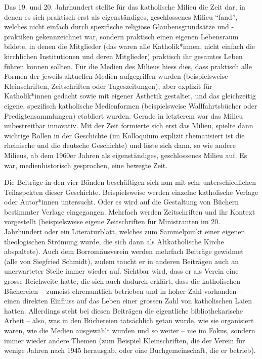 \documentclass[a4paper,
fontsize=11pt,
oneside,
numbers=noperiodatend,
parskip=half-,
bibliography=totoc,
final
]{scrartcl}
\begin{document}
Das 19. und 20. Jahrhundert stellte für das katholische Milieu die Zeit
dar, in denen es sich praktisch erst als eigenständiges, geschlossenes
Milieu \enquote{fand}, welches nicht einfach durch spezifische religiöse
Glaubensgrundsätze und -praktiken gekennzeichnet war, sondern praktisch
einen eigenen Lebensraum bildete, in denen die Mitglieder (das waren
alle Katholik*innen, nicht einfach die kirchlichen Institutionen und
deren Mitglieder) praktisch ihr gesamtes Leben führen können sollten.
Für die Medien des Milieus hiess dies, dass praktisch alle Formen der
jeweils aktuellen Medien aufgegriffen wurden (beispielsweise
Kleinschriften, Zeitschriften oder Tageszeitungen), aber explizit für
Katholik*innen gedacht sowie mit eigener Ästhetik gestaltet, und das
gleichzeitig eigene, spezifisch katholische Medienformen (beispielsweise
Wallfahrtsbücher oder Predigtensammlungen) etabliert wurden. Gerade in
letzterem war das Milieu unbestreitbar innovativ. Mit der Zeit formierte
sich erst das Milieu, spielte dann wichtige Rollen in der Geschichte (im
Kolloquium explizit thematisiert ist die rheinische und die deutsche
Geschichte) und löste sich dann, so wie andere Milieus, ab dem 1960er
Jahren als eigenständiges, geschlossenes Milieu auf. Es war,
medienhistorisch gesprochen, eine bewegte Zeit.

Die Beiträge in den vier Bänden beschäftigen sich nun mit sehr
unterschiedlichen Teilaspekten dieser Geschichte. Beispielsweise werden
einzelne katholische Verlage oder Autor*innen untersucht. Oder es wird
auf die Gestaltung von Büchern bestimmter Verlage eingegangen. Mehrfach
werden Zeitschriften und ihr Kontext vorgestellt (beispielsweise eigene
Zeitschriften für Ministranten im 20. Jahrhundert oder ein
Literaturblatt, welches zum Sammelpunkt einer eigenen theologischen
Strömung wurde, die sich dann als Altkatholische Kirche abspaltete).
Auch dem Borromäusverein werden mehrfach Beiträge gewidmet (alle von
Siegfried Schmidt), zudem taucht er in anderen Beiträgen auch an
unerwarteter Stelle immer wieder auf. Sichtbar wird, dass er als Verein
eine grosse Reichweite hatte, die sich auch dadurch erklärt, dass die
katholischen Büchereien -- zumeist ehrenamtlich betrieben und in hoher
Zahl vorhanden -- einen direkten Einfluss auf das Leben einer grossen
Zahl von katholischen Laien hatten. Allerdings steht bei diesen
Beiträgen die eigentliche bibliothekarische Arbeit -- also, was in den
Büchereien tatsächlich getan wurde, wie sie organisiert waren, wie die
Medien ausgewählt wurden und so weiter -- nie im Fokus, sondern immer
wieder andere Themen (zum Beispiel Kleinschriften, die der Verein für
wenige Jahren nach 1945 herausgab, oder eine Buchgemeinschaft, die er
betrieb).
\end{document}
